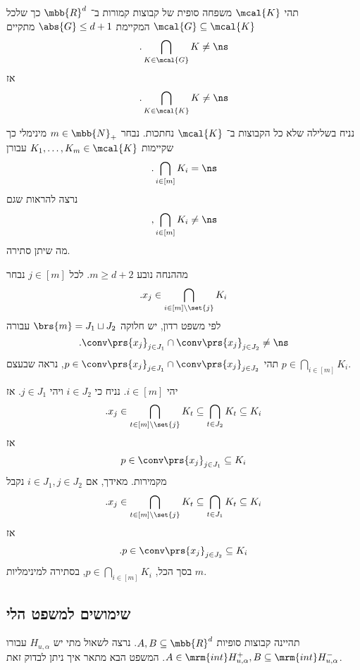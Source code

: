 \documentclass[a4paper,10pt,twoside,openany]{book}
\begin{document}
\begin{theorem}[הלי]
תהי
$\mcal{K}$
משפחה סופית של קבוצות קמורות ב־%
$\mbb{R}^d$
כך שלכל
$\mcal{G} \subseteq \mcal{K}$
המקיימת
$\abs{G} \leq d+1$
מתקיים
\[\text{.} \bigcap_{K \in \mcal{G}} K \neq \ns\]
אז
\[\text{.} \bigcap_{K \in \mcal{K}} K \neq \ns\]
\end{theorem}

\begin{theorem}
נניח בשלילה שלא כל הקבוצות ב־%
$\mcal{K}$
נחתכות. נבחר
$m \in \mbb{N}_+$
מינימלי כך שקיימות
$K_1, \ldots, K_m \in \mcal{K}$
עבורן
\begin{align*}
\text{.} \bigcap_{i \in [m]} K_i = \ns
\end{align*}
נרצה להראות שגם
\[\text{,} \bigcap_{i \in [m]} K_i \neq \ns\]
מה שיתן סתירה.

מההנחה נובע
$m \geq d+2$.
לכל
$j \in [m]$
נבחר
\[\text{.} x_j \in \bigcap_{i \in [m] \setminus \set{j}} K_i\]
לפי משפט רדון, יש חלוקה
$\brs{m} = J_1 \sqcup J_2$
עבורה
\[\text{.} \conv\prs{x_j}_{j \in J_1} \cap \conv\prs{x_j}_{j \in J_2} \neq \ns\]
תהי
$p \in \conv\prs{x_j}_{j \in J_1} \cap \conv\prs{x_j}_{j \in J_2}$,
נראה שבעצם
$p \in \bigcap_{i \in [m]} K_i$.

יהי
$i \in [m]$.
נניח כי
$i \in J_2$
ויהי
$j \in J_1$.
אז
\begin{align*}
\text{.} x_j \in \bigcap_{t \in [m] \setminus \set{j}} K_t \subseteq \bigcap_{t \in J_2} K_t \subseteq K_i
\end{align*}
אז
\begin{align*}
p \in \conv\prs{x_j}_{j \in J_1} \subseteq K_i
\end{align*}
מקמירות.
מאידך, אם
$i \in J_1, j \in J_2$
נקבל
\begin{align*}
\text{.} x_j \in \bigcap_{t \in [m] \setminus \set{j}} K_t \subseteq \bigcap_{t \in J_1} K_t \subseteq K_i
\end{align*}
אז
\begin{align*}
\text{.} p \in \conv\prs{x_j}_{j \in J_2} \subseteq K_i
\end{align*}
בסך הכל,
$p \in \bigcap_{i \in [m]} K_i$,
בסתירה למינימליות
$m$.
\end{theorem}

\subsection{שימושים למשפט הלי}

תהיינה קבוצות סופיות
$A,B \subseteq \mbb{R}^d$.
נרצה לשאול מתי יש
$H_{u,\alpha}$
עבורו
$A \in \mrm{int} H_{u,\alpha}^+, B \subseteq \mrm{int} H_{u,\alpha}^-$.
המשפט הבא מתאר איך ניתן לבדוק זאת.
\end{document}
